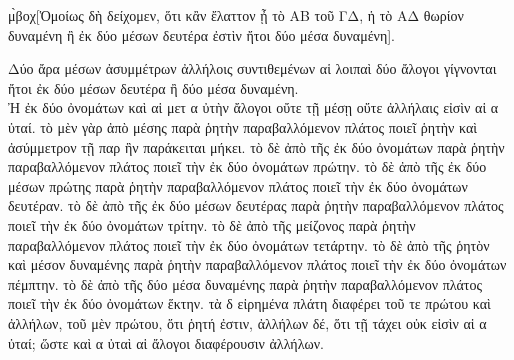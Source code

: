 \begin{Parallel}{}{}
{\epsfysize=2in
\centerline{}

{\greekfont μ̀βοχ{[}Ὁμοίως δὴ δείχομεν, ὅτι κἂν ἔλαττον ᾖ τὸ ΑΒ
τοῦ ΓΔ, ἡ τὸ ΑΔ θωρίον δυναμένη ἢ ἐκ δύο μέσων
δευτέρα ἐστὶν ἤτοι δύο μέσα δυναμένη].}

{\greekfont Δύο ἄρα μέσων ἀσυμμέτρων ἀλλήλοις συντιθεμένων αἱ λοιπαὶ
δύο ἄλογοι γίγνονται ἤτοι ἐκ δύο μέσων δευτέρα ἢ δύο μέσα
δυναμένη.}\\

{\greekfont Ἠ ἐκ δύο ὀνομάτων καὶ αἱ μετ α ὐτὴν ἄλογοι οὔτε
τῇ μέσῃ οὔτε ἀλλήλαις εἰσὶν αἱ α ὐταί. τὸ μὲν γὰρ ἀπὸ
μέσης παρὰ ῥητὴν παραβαλλόμενον πλάτος ποιεῖ ῥητὴν καὶ
ἀσύμμετρον τῇ παρ ἣν παράκειται μήκει. τὸ δὲ ἀπὸ τῆς
ἐκ δύο ὀνομάτων παρὰ ῥητὴν παραβαλλόμενον πλάτος ποιεῖ
τὴν ἐκ δύο ὀνομάτων πρώτην. τὸ δὲ ἀπὸ τῆς ἐκ δύο μέσων
πρώτης παρὰ ῥητὴν παραβαλλόμενον πλάτος ποιεῖ τὴν ἐκ δύο
ὀνομάτων δευτέραν. τὸ δὲ ἀπὸ τῆς ἐκ δύο μέσων δευτέρας παρὰ
ῥητὴν παραβαλλόμενον πλάτος ποιεῖ τὴν ἐκ δύο ὀνομάτων
τρίτην. τὸ δὲ ἀπὸ τῆς μείζονος παρὰ ῥητὴν παραβαλλόμενον
πλάτος ποιεῖ τὴν ἐκ δύο ὀνομάτων
τετάρτην. τὸ δὲ ἀπὸ τῆς ῥητὸν καὶ μέσον δυναμένης
παρὰ ῥητὴν παραβαλλόμενον πλάτος ποιεῖ τὴν ἐκ δύο
ὀνομάτων πέμπτην. τὸ δὲ ἀπὸ τῆς δύο μέσα δυναμένης
παρὰ ῥητὴν παραβαλλόμενον πλάτος ποιεῖ τὴν ἐκ δύο ὀνομάτων
ἕκτην. τὰ δ εἰρημένα πλάτη διαφέρει τοῦ τε πρώτου καὶ ἀλλήλων,
τοῦ μὲν πρώτου, ὅτι ῥητή ἐστιν, ἀλλήλων δέ, ὅτι τῇ τάχει
οὐκ εἰσὶν αἱ α ὐταί; ὥστε καὶ α ὐταὶ αἱ ἄλογοι διαφέρουσιν
ἀλλήλων.}}

\end{Parallel}
